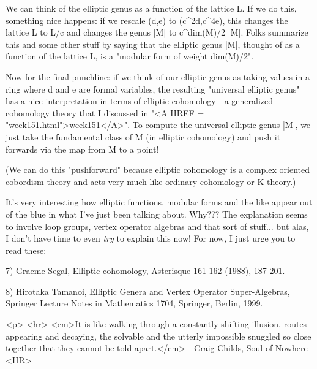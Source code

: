 We can think of the elliptic genus as a function of the lattice L.   
If we do this, something nice happens: if we rescale (d,e) to (c^{2d},c^{4e}), this changes the 
lattice L to L/c and changes the genus |M| to c^{dim(M)/2} |M|.  Folks 
summarize this and some other stuff by saying that the elliptic genus |M|, 
thought of as a function of the lattice L, is a "modular form of 
weight dim(M)/2".

Now for the final punchline: if we think of our elliptic genus as taking
values in a ring where d and e are formal variables, the resulting
"universal elliptic genus" has a nice interpretation in terms
of elliptic cohomology - a generalized cohomology theory that I
discussed in "<A HREF = "week151.html">week151</A>".  To
compute the universal elliptic genus |M|, we just take the fundamental
class of M (in elliptic cohomology) and push it forwards via the map
from M to a point!

(We can do this "pushforward" because elliptic cohomology is a
complex oriented cobordism theory and acts very much like ordinary
cohomology or K-theory.)

It's very interesting how elliptic functions, modular forms and the like
appear out of the blue in what I've just been talking about.  Why???
The explanation seems to involve loop groups, vertex operator algebras and
that sort of stuff... but alas, I don't have time to even \emph{try} 
to explain this now!  For now, I just urge you to read these:

7) Graeme Segal, Elliptic cohomology, Asterisque 161-162 (1988), 187-201.  

8) Hirotaka Tamanoi, Elliptic Genera and Vertex Operator Super-Algebras,
Springer Lecture Notes in Mathematics 1704, Springer, Berlin, 1999.





<p> <hr>
<em>It is like walking through a constantly shifting illusion, 
routes appearing and decaying, the solvable and the utterly impossible
snuggled so close together that they cannot be told apart.</em> - 
Craig Childs, Soul of Nowhere
<HR>



